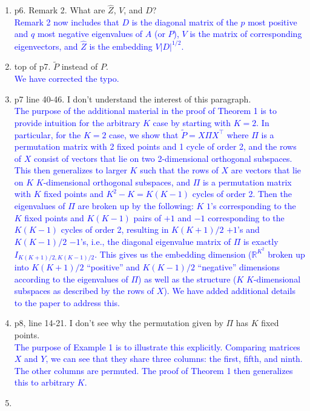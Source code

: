 \documentclass[
]{article}
\begin{document}
\begin{enumerate}
{  }
\item
  p6. Remark 2. What are \(\hat{Z}\), \(V\), and \(D\)?\\
  \textcolor{blue}{
  Remark 2 now includes that $D$ is the diagonal matrix of the $p$ most positive and $q$ most negative eigenvalues of $A$ (or $P$), $V$ is the matrix of corresponding eigenvectors, and $\hat{Z}$ is the embedding $V |D|^{1/2}$.
  }
\item
  top of p7. \(\tilde{P}\) instead of \({P}\).\\
  \textcolor{blue}{
  We have corrected the typo. 
  }
\item
  p7 line 40-46. I don't understand the interest of this paragraph.\\
  \textcolor{blue}{
  The purpose of the additional material in the proof of Theorem 1 is to provide intuition for the arbitrary $K$ case by starting with $K = 2$. 
  In particular, for the $K = 2$ case, we show that $\tilde{P} = X \Pi X^\top$ where $\Pi$ is a permutation matrix with 2 fixed points and 1 cycle of order 2, and the rows of $X$ consist of vectors that lie on two 2-dimensional orthogonal subspaces. 
  This then generalizes to larger $K$ such that the rows of $X$ are vectors that lie on $K$ $K$-dimensional orthogonal subspaces, and $\Pi$ is a permutation matrix with $K$ fixed points and $K^2 - K = K (K - 1)$ cycles of order 2. 
  Then the eigenvalues of $\Pi$ are broken up by the following: $K$ $1$'s corresponding to the $K$ fixed points and $K (K - 1)$ pairs of $+1$ and $-1$ corresponding to the $K (K - 1)$ cycles of order 2, 
  resulting in $K (K + 1) / 2$ $+1$'s and $K (K - 1) / 2$ $-1$'s, i.e., the diagonal eigenvalue matrix of $\Pi$ is exactly $I_{K (K + 1) / 2, K (K - 1) / 2}$. 
  This gives us the embedding dimension ($\mathbb{R}^{K^2}$ broken up into $K (K + 1) / 2$ ``positive'' and $K (K - 1) / 2$ ``negative'' dimensions according to the eigenvalues of $\Pi$) as well as the structure ($K$ $K$-dimensional subspaces as described by the rows of $X$). 
  We have added additional details to the paper to address this. 
  }
\item
  p8, line 14-21. I don't see why the permutation given by \(\Pi\) has
  \(K\) fixed points.\\
  \textcolor{blue}{
  The purpose of Example 1 is to illustrate this explicitly. 
  Comparing matrices $X$ and $Y$, we can see that they share three columns: the first, fifth, and ninth. 
  The other columns are permuted. 
  The proof of Theorem 1 then generalizes this to arbitrary $K$. 
  }
\item

\end{enumerate}
\end{document}
